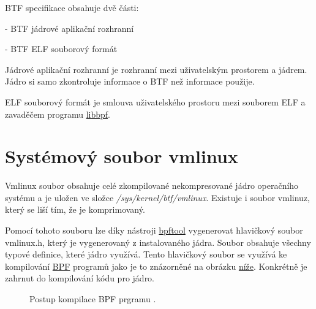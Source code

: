 BTF specifikace obsahuje dvě části:

\quad \quad - BTF jádrové aplikační rozhranní

\quad \quad - BTF ELF souborový formát

Jádrové aplikační rozhranní je rozhranní mezi uživatelským prostorem a jádrem. Jádro si samo zkontroluje informace o BTF než informace použije.

ELF souborový formát je smlouva uživatelského prostoru mezi souborem ELF a zavaděčem programu \hyperref[sec:BPF]{libbpf}.

\section{Systémový soubor vmlinux}
\label{sec:vmlinux}

Vmlinux soubor obsahuje celé zkompilované nekompresované jádro operačního systému a je uložen ve složce \emph{/sys/kernel/btf/vmlinux}. Existuje i soubor vmlinuz, který se liší tím, že je komprimovaný.

Pomocí tohoto souboru lze díky nástroji \hyperref[sec:bpftool]{bpftool} vygenerovat hlavičkový soubor vmlinux.h, který je vygenerovaný z instalovaného jádra. Soubor obsahuje všechny typové definice, které jádro využívá. Tento hlavičkový soubor se využívá ke kompilování \hyperref[sec:BPF]{BPF} programů jako je to znázorněné na obrázku \hyperref[pic:PostupKompilaceBPF]{níže}. Konkrétně je zahrnut do kompilování kódu pro jádro.

\begin{figure}[H]
  \centering
  \caption{Postup kompilace BPF prgramu \cite{}.}
  \label{pic:PostupKompilaceBPF}
\end{figure}

